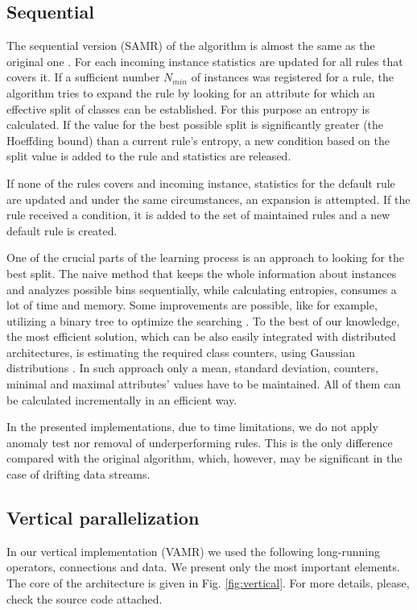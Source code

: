 \documentclass[journal]{IEEEtran}
\begin{document}
\subsection{Sequential}
The sequential version (SAMR) of the algorithm is almost the same as the original one \cite{Gama:2011}. For each incoming instance statistics are updated for all rules that covers it. If a sufficient number $N_{min}$ of instances was registered for a rule, the algorithm tries to expand the rule by looking for an attribute for which an effective split of classes can be established. For this purpose an entropy is calculated. If the value for the best possible split is significantly greater (the Hoeffding bound) than a current rule's entropy, a new condition based on the split value is added to the rule and statistics are released.

If none of the rules covers and incoming instance, statistics for the default rule are updated and under the same circumstances, an expansion is attempted. If the rule received a condition, it is added to the set of maintained rules and a new default rule is created.

One of the crucial parts of the learning process is an approach to looking for the best split. The naive method that keeps the whole information about instances and analyzes possible bins sequentially, while calculating entropies, consumes a lot of time and memory. Some improvements are possible, like for example, utilizing a binary tree to optimize the searching \cite{Gama:2003}. To the best of our knowledge, the most efficient solution, which can be also easily integrated with distributed architectures, is estimating the required class counters, using Gaussian distributions \cite{Pfahringer:2008}. In such approach only a mean, standard deviation, counters, minimal and maximal attributes' values have to be maintained. All of them can be calculated incrementally in an efficient way.

In the presented implementations, due to time limitations, we do not apply anomaly test nor removal of underperforming rules. This is the only difference compared with the original algorithm, which, however, may be significant in the case of drifting data streams.

\subsection{Vertical parallelization}

In our vertical implementation (VAMR) we used the following long-running operators, connections and data. We present only the most important elements. The core of the architecture is given in Fig. \ref{fig:vertical}. For more details, please, check the source code attached.
\end{document}
